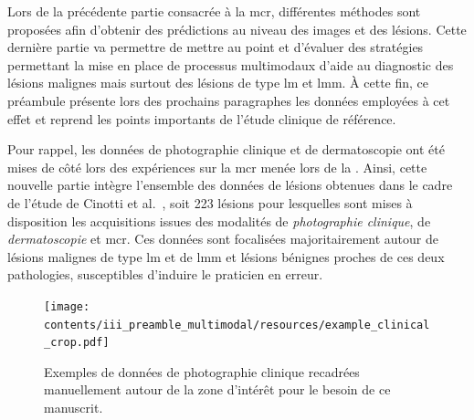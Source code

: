 \renewcommand{\thechapter}{\roman{chapter}}
\setcounter{chapter}{3}
\setcounter{figure}{0}

\label{chap:preamble_multimodal}
Lors de la précédente partie consacrée à la \acrlong{mcr}, différentes méthodes sont proposées afin d'obtenir des prédictions au niveau des images et des lésions. Cette dernière partie va permettre de mettre au point et d'évaluer des stratégies permettant la mise en place de processus multimodaux d'aide au diagnostic des lésions malignes mais surtout des lésions de type \gls{lm} et \gls{lmm}. À cette fin, ce préambule présente lors des prochains paragraphes les données employées à cet effet et reprend les points importants de l'étude clinique de référence.\par

Pour rappel, les données de photographie clinique et de dermatoscopie ont été mises de côté lors des expériences sur la \gls{mcr} menée lors de la . Ainsi, cette nouvelle partie intègre l'ensemble des données de lésions obtenues dans le cadre de l'étude de Cinotti et al.~\cite{Cinotti2018}, soit 223 lésions pour lesquelles sont mises à disposition les acquisitions issues des modalités de \textit{photographie clinique}, de \textit{dermatoscopie} et \gls{mcr}. Ces données sont focalisées majoritairement autour de lésions malignes de type \gls{lm} et de \gls{lmm} et lésions bénignes proches de ces deux pathologies, susceptibles d'induire le praticien en erreur.\par 

\begin{figure}[H]
    \begin{center}
        \texttt{[image: contents/iii\_preamble\_multimodal/resources/example\_clinical\_crop.pdf]}
        \caption{Exemples de données de photographie clinique recadrées manuellement autour de la zone d'intérêt pour le besoin de ce manuscrit.}
        \label{fig:example_clinical_crop}
    \end{center} 
\end{figure}\par
\clearpage

